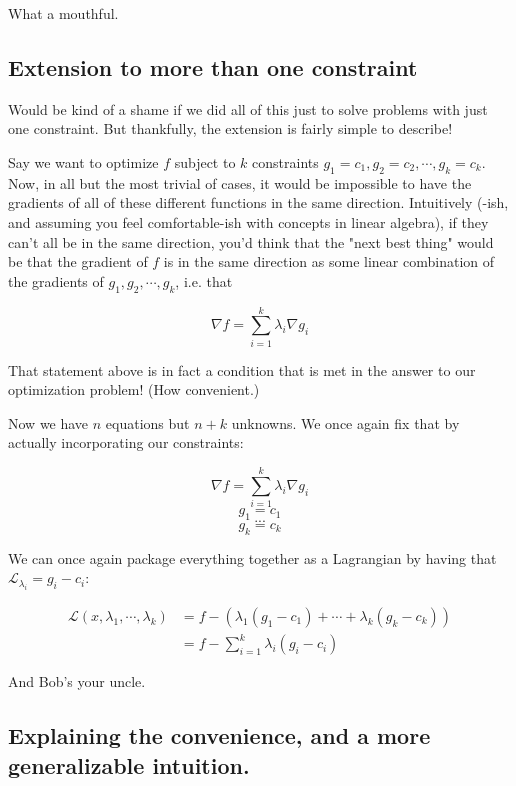 \documentclass[letterpaper,12pt]{report}
\begin{document}
What a mouthful.

\subsection{Extension to more than one
constraint}\label{extension-to-more-than-one-constraint}

Would be kind of a shame if we did all of this just to solve problems
with just one constraint. But thankfully, the extension is fairly simple
to describe!

Say we want to optimize \(f\) subject to \(k\) constraints
\(g_1 = c_1, g_2 = c_2, \cdots, g_k = c_k\). Now, in all but the most
trivial of cases, it would be impossible to have the gradients of all of
these different functions in the same direction. Intuitively (-ish, and
assuming you feel comfortable-ish with concepts in linear algebra), if
they can't all be in the same direction, you'd think that the "next best
thing" would be that the gradient of \(f\) is in the same direction as
some linear combination of the gradients of \(g_1, g_2, \cdots, g_k\),
i.e. that

\[ \nabla f = \sum_{i=1}^k \lambda _i \nabla g_i \]

That statement above is in fact a condition that is met in the answer to
our optimization problem! (How convenient.)

Now we have \(n\) equations but \(n+k\) unknowns. We once again fix that
by actually incorporating our constraints:

\[ \nabla f = \sum_{i=1}^k \lambda _i \nabla g_i \] \[ g_1 = c_1 \]
\[ ... \] \[ g_k = c_k \]

We can once again package everything together as a Lagrangian by having
that \(\mathcal{L}_{\lambda _i} = g_i - c_i\):

\[\begin{split} \mathcal{L}(x, \lambda _1, \cdots, \lambda _k) &= 
                                            f - (\lambda _1 (g_1 - c_1) + \cdots + \lambda _k (g_k - c_k) ) \\
                     &= f - \sum_{i=1}^k \lambda _i (g_i - c_i) \end{split}\]

And Bob's your uncle.

\subsection{Explaining the convenience, and a more generalizable intuition.}\label{explaining-the-convenience}
\end{document}
